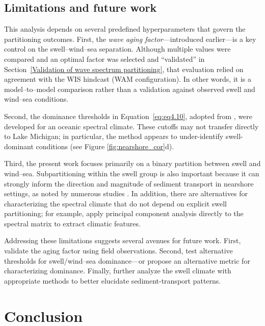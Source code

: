 \subsection{Limitations and future work}
\label{c4_Limitation}

This analysis depends on several predefined hyperparameters that govern the
partitioning outcomes. First, the \emph{wave aging factor}—introduced earlier—is
a key control on the swell–wind–sea separation. Although multiple values were
compared and an optimal factor was selected and “validated” in
Section~\ref{Validation of wave spectrum partitioning}, that evaluation relied
on agreement with the WIS hindcast (WAM configuration). In other words, it is a
model–to–model comparison rather than a validation against observed swell and
wind–sea conditions.

Second, the dominance thresholds in Equation~\ref{eq:eq4.10}, adopted from
\citet{mazzaretto2024worldwide}, were developed for an oceanic spectral climate.
These cutoffs may not transfer directly to Lake Michigan; in particular, the
method appears to under-identify swell-dominant conditions (see Figure
\ref{fig:nearshore_cor}d).

Third, the present work focuses primarily on a binary partition between swell
and wind–sea. Subpartitioning within the swell group is also important because
it can strongly inform the direction and magnitude of sediment transport in
nearshore settings, as noted by numerous studies
\citep[\eg][]{mazzaretto2024worldwide,coates_beach_1998,langodan_unraveling_2018,portilla-yandun_climate_2016,sartini_spectral_2024,venolia_historical_2024,zheng_investigation_2024}.
In addition, there are alternatives for characterizing the spectral climate that
do not depend on explicit swell partitioning; for example,
\citet{echevarria_influence_2020,echevarria_seasonal_2019} apply principal
component analysis directly to the spectral matrix to extract climatic features.

Addressing these limitations suggests several avenues for future work. First,
validate the aging factor using field observations. Second, test alternative
thresholds for swell/wind–sea dominance—or propose an alternative metric for
characterizing dominance. Finally, further analyze the swell climate with
appropriate methods to better elucidate sediment-transport patterns.

\section{Conclusion}
\label{c4_Conclusion}

